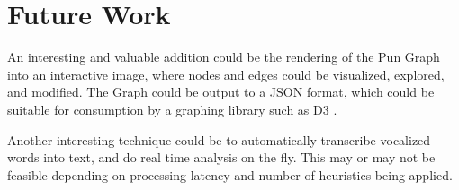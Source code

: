 \section{Future Work}

An interesting and valuable addition could be the rendering of the Pun Graph into an interactive image, where nodes and edges could be visualized, explored, and modified. The Graph could be output to a JSON format, which could be suitable for consumption by a graphing library such as D3 \cite{D3}.

Another interesting technique could be to automatically transcribe vocalized words into text, and do real time analysis on the fly. This may or may not be feasible depending on processing latency and number of heuristics being applied.

